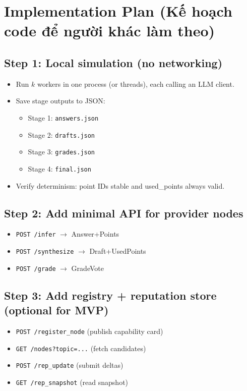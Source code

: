 \documentclass[11pt]{article}
\begin{document}
\section{Implementation Plan (Kế hoạch code để người khác làm theo)}
\subsection{Step 1: Local simulation (no networking)}
\begin{itemize}[leftmargin=1.2em]
  \item Run \(k\) workers in one process (or threads), each calling an LLM client.
  \item Save stage outputs to JSON:
  \begin{itemize}[leftmargin=1.2em]
    \item Stage 1: \texttt{answers.json}
    \item Stage 2: \texttt{drafts.json}
    \item Stage 3: \texttt{grades.json}
    \item Stage 4: \texttt{final.json}
  \end{itemize}
  \item Verify determinism: point IDs stable and used\_points always valid.
\end{itemize}

\subsection{Step 2: Add minimal API for provider nodes}
\begin{itemize}[leftmargin=1.2em]
  \item \texttt{POST /infer} \(\rightarrow\) Answer+Points
  \item \texttt{POST /synthesize} \(\rightarrow\) Draft+UsedPoints
  \item \texttt{POST /grade} \(\rightarrow\) GradeVote
\end{itemize}

\subsection{Step 3: Add registry + reputation store (optional for MVP)}
\begin{itemize}[leftmargin=1.2em]
  \item \texttt{POST /register\_node} (publish capability card)
  \item \texttt{GET /nodes?topic=...} (fetch candidates)
  \item \texttt{POST /rep\_update} (submit deltas)
  \item \texttt{GET /rep\_snapshot} (read snapshot)
\end{itemize}
\end{document}
